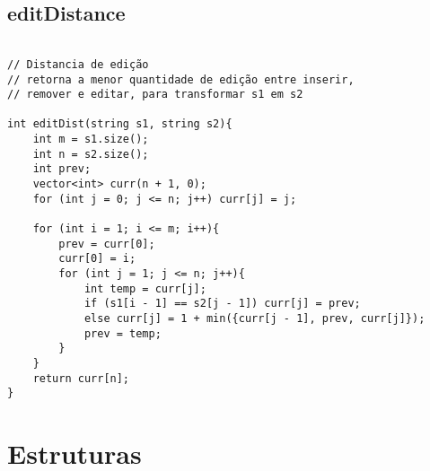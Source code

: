 \documentclass[landscape,twocolumn,10pt,a4paper]{article}
\begin{document}
\subsection{editDistance}
\begin{verbatim}

// Distancia de edição 
// retorna a menor quantidade de edição entre inserir,
// remover e editar, para transformar s1 em s2

int editDist(string s1, string s2){
    int m = s1.size();
    int n = s2.size();
    int prev; 
    vector<int> curr(n + 1, 0); 
    for (int j = 0; j <= n; j++) curr[j] = j;
  
    for (int i = 1; i <= m; i++){
        prev = curr[0]; 
        curr[0] = i;
        for (int j = 1; j <= n; j++){
            int temp = curr[j];
            if (s1[i - 1] == s2[j - 1]) curr[j] = prev;
            else curr[j] = 1 + min({curr[j - 1], prev, curr[j]});
            prev = temp;
        }
    }
    return curr[n];
}

\end{verbatim}

\section{Estruturas}
\end{document}
